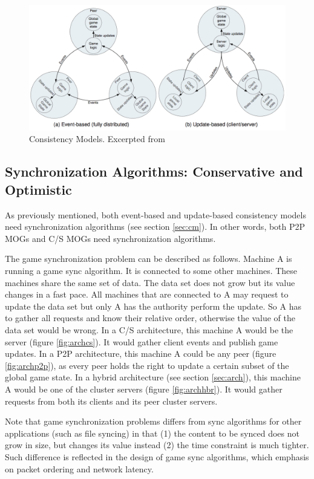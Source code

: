 \documentclass{article}
\begin{document}
\begin{figure}
\begin{center}
\includegraphics[scale=0.3]{images/sm.png}
\caption{Consistency Models. Excerpted from \cite{Gilmore12}}
\label{fig:cm}
\end{center}
\end{figure}

\subsection{Synchronization Algorithms: Conservative and Optimistic}
\label{sec:sa}
As previously mentioned, both event-based and update-based consistency models need synchronization algorithms (see section \ref{sec:cm}). In other words, both P2P MOGs and C/S MOGs need synchronization algorithms.

The game synchronization problem can be described as follows. Machine A is running a game sync algorithm. It is connected to some other machines. These machines share the same set of data. The data set does not grow but its value changes in a fast pace. All machines that are connected to A may request to update the data set but only A has the authority perform the update. So A has to gather all requests and know their relative order, otherwise the value of the data set would be wrong. In a C/S architecture, this machine A would be the server (figure \ref{fig:archcs}). It would gather client events and publish game updates. In a P2P architecture, this machine A could be any peer (figure \ref{fig:archp2p}), as every peer holds the right to update a certain subset of the global game state. In a hybrid architecture (see section \ref{sec:arch}), this machine A would be one of the cluster servers (figure \ref{fig:archhbr}). It would gather requests from both its clients and its peer cluster servers.

Note that game synchronization problems differs from sync algorithms for other applications (such as file syncing) in that (1) the content to be synced does not grow in size, but changes its value instead (2) the time constraint is much tighter. Such difference is reflected in the design of game sync algorithms, which emphasis on packet ordering and network latency.
\end{document}
